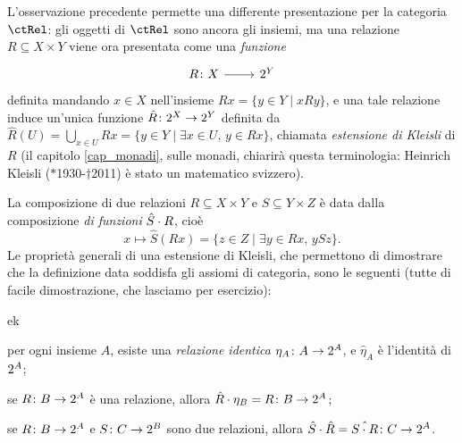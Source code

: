 \begin{remark}\label{diff_pres_cat_rel}
 L'osservazione precedente permette una differente presentazione per la categoria \(\ctRel\): gli oggetti di \(\ctRel\) sono ancora gli insiemi, ma una relazione \(R\subseteq X\times Y\) viene ora presentata come una \emph{funzione}
 \[\dmFun RX{\pow Y}\]
 definita mandando \(x\in X\) nell'insieme \(Rx = \{y\in Y\mid xRy\}\), e una tale relazione induce un'unica funzione \(\hat R \colon 2^{X}\to 2^{Y}\) definita da \(\hat R(U) = \bigcup_{x\in U}Rx = \{y\in Y\mid \exists x\in U,\, y\in Rx\}\), chiamata \emph{estensione di Kleisli} di \(R\) (il capitolo \ref{cap_monadi}, sulle monadi, chiarirà questa terminologia: Heinrich Kleisli (\(*\)1930-\(\dag\)2011) è stato un matematico svizzero).

 La composizione di due relazioni \(R\subseteq X\times Y\) e \(S\subseteq Y\times Z\) è data dalla composizione \emph{di funzioni} \(\hat S\cdot R\), cioè
 \[
  x \mapsto \hat S(Rx) = \{z\in Z\mid \exists y\in Rx,\, ySz\}.
 \]
 Le proprietà generali di una estensione di Kleisli, che permettono di dimostrare che la definizione data soddisfa gli assiomi di categoria, sono le seguenti (tutte di facile dimostrazione, che lasciamo per esercizio):
 \begin{enumtag}{ek}
  \item \label{ek_1} per ogni insieme \(A\), esiste una \emph{relazione identica} \(\eta_A \colon A\to 2^{A}\), e \(\hat\eta_A\) è l'identità di \(2^{A}\);
  \item \label{ek_2} se \(R \colon B\to 2^{A}\) è una relazione, allora \(\hat R\cdot \eta_B = R \colon B \to2^{A}\);
  \item \label{ek_3} se \(R \colon B\to 2^{A}\) e \(S \colon C\to 2^{B}\) sono due relazioni, allora \(\hat S\cdot \hat R = \hat{S\cdot R} \colon C\to 2^{A}\).
 \end{enumtag}
\end{remark}
